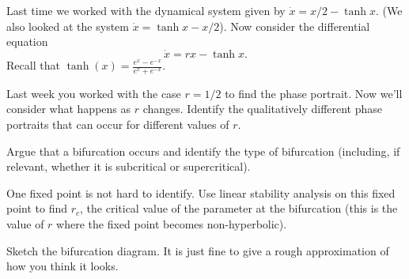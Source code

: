 \documentclass[12pt,letterpaper,noanswers]{exam}
\begin{document}
\begin{questions}


\item Last time we worked with the dynamical system given by $\dot{x} = x/2 - \tanh x$.  (We also looked at the system $\dot{x} = \tanh x - x/2$).  Now consider the differential equation
\[\dot{x} = r x - \tanh x.\]  Recall that $\tanh(x) = \frac{e^x-e^{-x}}{e^x+e^{-x}}.$
\begin{parts}
\item Last week you worked with the case $r=1/2$ to find the phase portrait.  Now we'll consider what happens as $r$ changes.  Identify the qualitatively different phase portraits that can occur for different values of $r$.
\item  Argue that a bifurcation occurs and identify the type of bifurcation (including, if relevant, whether
it is subcritical or supercritical).
\item One fixed point is not hard to identify.  Use linear stability analysis on this fixed point to find $r_c$, the critical value of the parameter at the bifurcation (this is the value of $r$ where the fixed point becomes non-hyperbolic).
\item Sketch the bifurcation diagram.  It is just fine to give a rough approximation of how you think it looks.


\end{parts}
\end{questions}

\vfill

\end{document}
